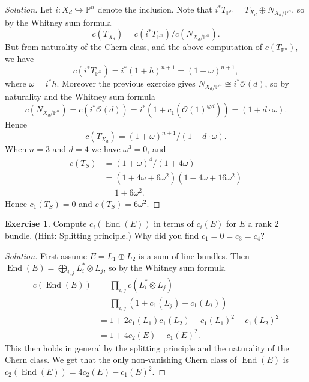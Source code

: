 \documentclass{article}
\theoremstyle{definition}
\newtheorem*{exercise}{Exercise}
\DeclareMathOperator{\End}{End}
\renewcommand{\O}{\mathcal{O}}
\renewcommand{\P}{\mathbb{P}}
\begin{document}
\begin{proof}[Solution]
    Let $i:X_d\hookrightarrow\P^n$ denote the inclusion. Note that
    $i^*T_{\P^n}=T_{X_d}\oplus N_{X_d/\P^n}$, so by the Whitney sum
    formula
    \begin{equation*}
        c(T_{X_d}) = c(i^*T_{\P^n})/c(N_{X_d/\P^n}).
    \end{equation*}
    But from naturality of the Chern class, and the above computation of
    $c(T_{\P^n})$, we have
    \begin{equation*}
        c(i^*T_{\P^n}) = i^*(1+h)^{n+1} = (1+\omega)^{n+1},
    \end{equation*}
    where $\omega=i^*h$. Moreover the previous exercise gives
    $N_{X_d/\P^n}\cong i^*\O(d)$, so by naturality and the Whitney sum formula
    \begin{equation*}
        c(N_{X_d/\P^n})
            = c(i^*\O(d))
            = i^*(1+c_1(\O(1)^{\otimes d}))
            = (1+d\cdot\omega).
    \end{equation*}
    Hence
    \begin{equation*}
        c(T_{X_d}) = (1+\omega)^{n+1}/(1+d\cdot\omega).
    \end{equation*}
    When $n=3$ and $d=4$ we have $\omega^3=0$, and
    \begin{align*}
        c(T_S)
            &= (1+\omega)^4/(1+4\omega) \\
            &= (1+4\omega+6\omega^2)(1-4\omega+16\omega^2) \\
            &= 1+6\omega^2.
    \end{align*}
    Hence $c_1(T_S)=0$ and $e(T_S)=6\omega^2$.
\end{proof}

\begin{exercise}
    Compute $c_i(\End(E))$ in terms of $c_i(E)$ for $E$ a rank 2 bundle. (Hint:
    Splitting principle.) Why did you find $c_1=0=c_3=c_4$?
\end{exercise}

\begin{proof}[Solution]
    First assume $E=L_1\oplus L_2$ is a sum of line bundles. Then
    $\End(E)=\bigoplus_{i,j}L_i^*\otimes L_j$, so by the Whitney sum formula
    \begin{align*}
        c(\End(E))
            &= \prod_{i,j}c(L_i^*\otimes L_j) \\
            &= \prod_{i,j}(1 + c_1(L_j) - c_1(L_i)) \\
            &= 1 + 2c_1(L_1)c_1(L_2) - c_1(L_1)^2 - c_1(L_2)^2 \\
            &= 1 + 4c_2(E) - c_1(E)^2.
    \end{align*}
    This then holds in general by the splitting principle and the naturality of
    the Chern class. We get that the only non-vanishing Chern class of $\End(E)$
    is $c_2(\End(E))=4c_2(E)-c_1(E)^2$.
\end{proof}
\end{document}
